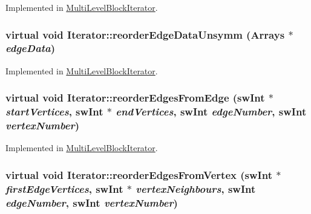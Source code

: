 Implemented in \hyperlink{classMultiLevelBlockIterator_a6db1df64cc6cb8c7fdc8ad6587f51a87}{MultiLevelBlockIterator}.\hypertarget{classIterator_aea73c3b4ba7c3cb6c56df6c5ddbe1f31}{
\subsubsection[{reorderEdgeDataUnsymm}]{\setlength{\rightskip}{0pt plus 5cm}virtual void Iterator::reorderEdgeDataUnsymm ({\bf Arrays} $\ast$ {\em edgeData})}}
\label{classIterator_aea73c3b4ba7c3cb6c56df6c5ddbe1f31}


Implemented in \hyperlink{classMultiLevelBlockIterator_a96adad6f8220ff77653f75150bbd1b3c}{MultiLevelBlockIterator}.\hypertarget{classIterator_ad467453135759642e4e4a9f9e5233771}{
\subsubsection[{reorderEdgesFromEdge}]{\setlength{\rightskip}{0pt plus 5cm}virtual void Iterator::reorderEdgesFromEdge ({\bf swInt} $\ast$ {\em startVertices}, \/  {\bf swInt} $\ast$ {\em endVertices}, \/  {\bf swInt} {\em edgeNumber}, \/  {\bf swInt} {\em vertexNumber})}}
\label{classIterator_ad467453135759642e4e4a9f9e5233771}


Implemented in \hyperlink{classMultiLevelBlockIterator_a329b89b35011569fd4c4c3e93518eea3}{MultiLevelBlockIterator}.\hypertarget{classIterator_a852bc84ccdfc84a9f0802ee070dd4cac}{
\subsubsection[{reorderEdgesFromVertex}]{\setlength{\rightskip}{0pt plus 5cm}virtual void Iterator::reorderEdgesFromVertex ({\bf swInt} $\ast$ {\em firstEdgeVertices}, \/  {\bf swInt} $\ast$ {\em vertexNeighbours}, \/  {\bf swInt} {\em edgeNumber}, \/  {\bf swInt} {\em vertexNumber})}}
\label{classIterator_a852bc84ccdfc84a9f0802ee070dd4cac}


